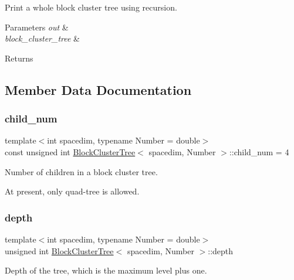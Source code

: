 Print a whole block cluster tree using recursion. 
\begin{DoxyParams}{Parameters}
{\em out} & \\
\hline
{\em block\+\_\+cluster\+\_\+tree} & \\
\hline
\end{DoxyParams}
\begin{DoxyReturn}{Returns}

\end{DoxyReturn}


\subsection{Member Data Documentation}
\mbox{\label{classBlockClusterTree_a000c439b578bcf4fa28b7f3edd6079e9}} 
\subsubsection{\texorpdfstring{child\+\_\+num}{child\_num}}
{\footnotesize\ttfamily template$<$int spacedim, typename Number = double$>$ \\
const unsigned int \hyperlink{classBlockClusterTree}{Block\+Cluster\+Tree}$<$ spacedim, Number $>$\+::child\+\_\+num = 4\hspace{0.3cm}{\ttfamily [static]}}

Number of children in a block cluster tree.

At present, only quad-\/tree is allowed. \mbox{\label{classBlockClusterTree_a77349ec9ccb36d45af3f176a93516897}} 
\subsubsection{\texorpdfstring{depth}{depth}}
{\footnotesize\ttfamily template$<$int spacedim, typename Number = double$>$ \\
unsigned int \hyperlink{classBlockClusterTree}{Block\+Cluster\+Tree}$<$ spacedim, Number $>$\+::depth\hspace{0.3cm}{\ttfamily [private]}}

Depth of the tree, which is the maximum level plus one. 

